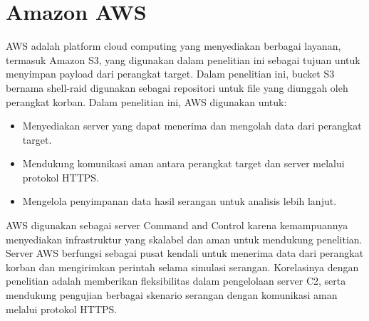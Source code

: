 \section{Amazon AWS}
AWS adalah platform cloud computing yang menyediakan berbagai layanan, termasuk Amazon S3, yang digunakan dalam penelitian ini sebagai tujuan untuk menyimpan payload dari perangkat target\citep{aws_s3}. Dalam penelitian ini, bucket S3 bernama shell-raid digunakan sebagai repositori untuk file yang diunggah oleh perangkat korban. Dalam penelitian ini, AWS digunakan untuk: 
\begin{itemize}
    \item Menyediakan server yang dapat menerima dan mengolah data dari perangkat target.
    \item Mendukung komunikasi aman antara perangkat target dan server melalui protokol HTTPS.
    \item Mengelola penyimpanan data hasil serangan untuk analisis lebih lanjut. 
\end{itemize}
 

AWS digunakan sebagai server Command and Control karena kemampuannya menyediakan infrastruktur yang skalabel dan aman untuk mendukung penelitian. Server AWS berfungsi sebagai pusat kendali untuk menerima data dari perangkat korban dan mengirimkan perintah selama simulasi serangan. Korelasinya dengan penelitian adalah memberikan fleksibilitas dalam pengelolaan server C2, serta mendukung pengujian berbagai skenario serangan dengan komunikasi aman melalui protokol HTTPS. 
